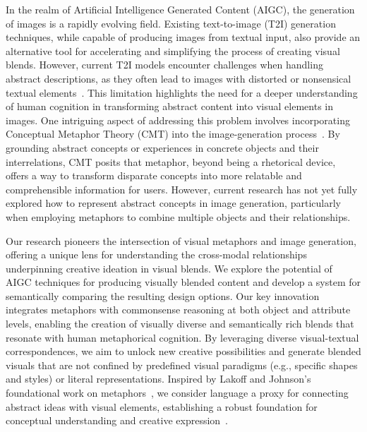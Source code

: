 In the realm of Artificial Intelligence Generated Content (AIGC), the generation of images is a rapidly evolving field. 
Existing text-to-image (T2I) generation techniques, while capable of producing images from textual input, also provide an alternative tool for accelerating and simplifying the process of creating visual blends.
However, current T2I models encounter challenges when handling abstract descriptions, as they often lead to images with distorted or nonsensical textual elements~\cite{Liao_Chen_Fu_Du_He_Wang_Han_Zhang_2024}.
This limitation highlights the need for a deeper understanding of human cognition in transforming abstract content into visual elements in images.
One intriguing aspect of addressing this problem involves incorporating Conceptual Metaphor Theory (CMT) into the image-generation process~\cite{MetaCLUE_10204033,lakoff2008metaphors}.
By grounding abstract concepts or experiences in concrete objects and their interrelations, CMT posits that metaphor, beyond being a rhetorical device, offers a way to transform disparate concepts into more relatable and comprehensible information for users.
However, current research has not yet fully explored how to represent abstract concepts in image generation, particularly when employing metaphors to combine multiple objects and their relationships.




Our research pioneers the intersection of visual metaphors and image generation, offering a unique lens for understanding the cross-modal relationships underpinning creative ideation in visual blends.
We explore the potential of AIGC techniques for producing visually blended content and develop a system for semantically comparing the resulting design options.
Our key innovation integrates metaphors with commonsense reasoning at both object and attribute levels, enabling the creation of visually diverse and semantically rich blends that resonate with human metaphorical cognition.
By leveraging diverse visual-textual correspondences, we aim to unlock new creative possibilities and generate blended visuals that are not confined by predefined visual paradigms (e.g., specific shapes and styles) or literal representations. 
Inspired by Lakoff and Johnson's foundational work on metaphors~\cite{lakoff2008metaphors}, we consider language a proxy for connecting abstract ideas with visual elements, establishing a robust foundation for conceptual understanding and creative expression~\cite{10.1145/3106625}.




